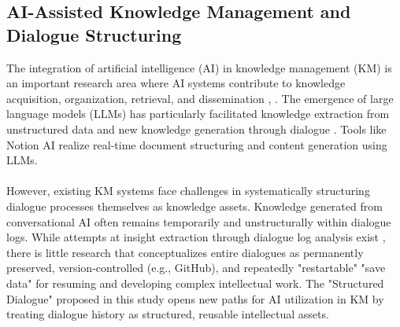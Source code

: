 \documentclass[11pt]{article}
\begin{document}
\subsection{AI-Assisted Knowledge Management and Dialogue Structuring}
The integration of artificial intelligence (AI) in knowledge management (KM) is an important research area where AI systems contribute to knowledge acquisition, organization, retrieval, and dissemination \cite{ref1}, \cite{ref14}. The emergence of large language models (LLMs) has particularly facilitated knowledge extraction from unstructured data and new knowledge generation through dialogue \cite{ref5}. Tools like Notion AI \cite{ref15} realize real-time document structuring and content generation using LLMs. \\
\\
However, existing KM systems face challenges in systematically structuring dialogue processes themselves as knowledge assets. Knowledge generated from conversational AI often remains temporarily and unstructurally within dialogue logs. While attempts at insight extraction through dialogue log analysis exist \cite{ref10}, there is little research that conceptualizes entire dialogues as permanently preserved, version-controlled (e.g., GitHub), and repeatedly "restartable" "save data" for resuming and developing complex intellectual work. The "Structured Dialogue" proposed in this study opens new paths for AI utilization in KM by treating dialogue history as structured, reusable intellectual assets.
\end{document}

